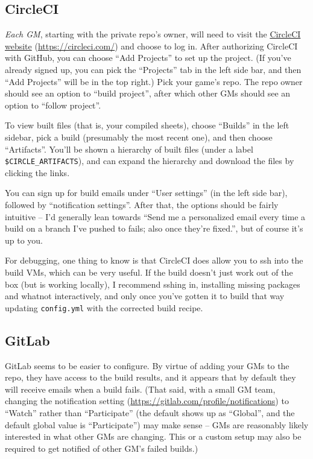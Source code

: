 \documentclass[green]{testgame}
\begin{document}
\subsection{CircleCI}

\emph{Each GM}, starting with the private repo's owner, will need to visit the \href{https://circleci.com/}{CircleCI website} (\url{https://circleci.com/}) and choose to log in. After authorizing CircleCI with GitHub, you can choose ``Add Projects'' to set up the project. (If you've already signed up, you can pick the ``Projects'' tab in the left side bar, and then ``Add Projects'' will be in the top right.) Pick your game's repo. The repo owner should see an option to ``build project'', after which other GMs should see an option to ``follow project''.

To view built files (that is, your compiled sheets), choose ``Builds'' in the left sidebar, pick a build (presumably the most recent one), and then choose ``Artifacts''. You'll be shown a hierarchy of built files (under a label \verb|$CIRCLE_ARTIFACTS|), and can expand the hierarchy and download the files by clicking the links.

You can sign up for build emails under ``User settings'' (in the left side bar), followed by ``notification settings''. After that, the options should be fairly intuitive -- I'd generally lean towards ``Send me a personalized email every time a build on a branch I've pushed to fails; also once they're fixed.'', but of course it's up to you.

For debugging, one thing to know is that CircleCI does allow you to ssh into the build VMs, which can be very useful. If the build doesn't just work out of the box (but is working locally), I recommend sshing in, installing missing packages and whatnot interactively, and only once you've gotten it to build that way updating \texttt{config.yml} with the corrected build recipe.

\subsection{GitLab}

GitLab seems to be easier to configure. By virtue of adding your GMs to the repo, they have access to the build results, and it appears that by default they will receive emails when a build fails. (That said, with a small GM team, changing the notification setting (\url{https://gitlab.com/profile/notifications}) to ``Watch'' rather than ``Participate'' (the default shows up as ``Global'', and the default global value is ``Participate'') may make sense -- GMs are reasonably likely interested in what other GMs are changing. This or a custom setup may also be required to get notified of other GM's failed builds.)
\end{document}

